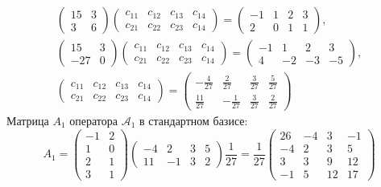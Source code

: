 \documentclass[12pt]{article}
\begin{document}
\begin{gather*}
        \begin{pmatrix}
            15 & 3 \\
            3  & 6
        \end{pmatrix}
        \begin{pmatrix}
            c_{11} & c_{12} & c_{13} & c_{14} \\
            c_{21} & c_{22} & c_{23} & c_{14}
        \end{pmatrix}
        =
        \begin{pmatrix}
            -1 & 1 & 2 & 3 \\
            2  & 0 & 1 & 1
        \end{pmatrix} , \\
        \begin{pmatrix}
            15  & 3 \\
            -27 & 0
        \end{pmatrix}
        \begin{pmatrix}
            c_{11} & c_{12} & c_{13} & c_{14} \\
            c_{21} & c_{22} & c_{23} & c_{14}
        \end{pmatrix}
        =
        \begin{pmatrix}
            -1 & 1  & 2  & 3  \\
            4  & -2 & -3 & -5
        \end{pmatrix} , \\
        \begin{pmatrix}
            c_{11} & c_{12} & c_{13} & c_{14} \\
            c_{21} & c_{22} & c_{23} & c_{14}
        \end{pmatrix}
        =
        \begin{pmatrix}
            -\frac{4}{27} & \frac{2}{27}   & \frac{3}{27} & \frac{5}{27} \\
            \frac{11}{27} & - \frac{1}{27} & \frac{3}{27} & \frac{2}{27}
        \end{pmatrix}
    \end{gather*}
    Матрица $A_1$ оператора $\mathcal{A}_1$ в стандартном базисе:
    \[
        A_1
        =
        \begin{pmatrix}
            -1 & 2 \\
            1  & 0 \\
            2  & 1 \\
            3  & 1
        \end{pmatrix}
        \begin{pmatrix}
            -4 & 2  & 3 & 5 \\
            11 & -1 & 3 & 2
        \end{pmatrix}
        \frac{1}{27}
        =
        \frac{1}{27}
        \begin{pmatrix}
            26 & -4 & 3  & -1 \\
            -4 & 2  & 3  & 5  \\
            3  & 3  & 9  & 12 \\
            -1 & 5  & 12 & 17
        \end{pmatrix}
    \]
\end{document}
